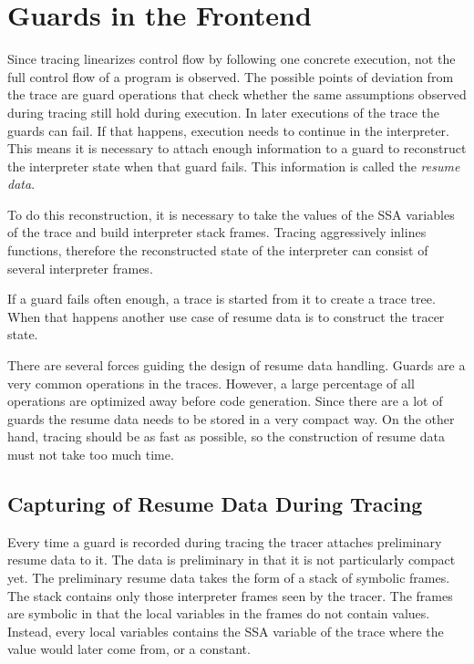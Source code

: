 \documentclass[10pt,preprint]{sigplanconf}
\begin{document}
\section{Guards in the Frontend} %
\label{sec:Resume Data}

Since tracing linearizes control flow by following one concrete execution,
not the full control flow of a program is observed.
The possible points of deviation from the trace are guard operations
that check whether the same assumptions observed during tracing still hold during execution.
In later executions of the trace the guards can fail.
If that happens, execution needs to continue in the interpreter.
This means it is necessary to attach enough information to a guard
to reconstruct the interpreter state when that guard fails.
This information is called the \emph{resume data}.

To do this reconstruction, it is necessary to take the values of the SSA
variables of the trace and build interpreter stack frames.  Tracing
aggressively inlines functions, therefore the reconstructed state of the
interpreter can consist of several interpreter frames.

If a guard fails often enough, a trace is started from it
to create a trace tree.
When that happens another use case of resume data
is to construct the tracer state.

There are several forces guiding the design of resume data handling.
Guards are a very common operations in the traces.
However, a large percentage of all operations
are optimized away before code generation.
Since there are a lot of guards
the resume data needs to be stored in a very compact way.
On the other hand, tracing should be as fast as possible,
so the construction of resume data must not take too much time.

\subsection{Capturing of Resume Data During Tracing}
\label{sub:capturing}

Every time a guard is recorded during tracing
the tracer attaches preliminary resume data to it.
The data is preliminary in that it is not particularly compact yet.
The preliminary resume data takes the form of a stack of symbolic frames.
The stack contains only those interpreter frames seen by the tracer.
The frames are symbolic in that the local variables in the frames
do not contain values.
Instead, every local variables contains the SSA variable of the trace
where the value would later come from, or a constant.
\end{document}
